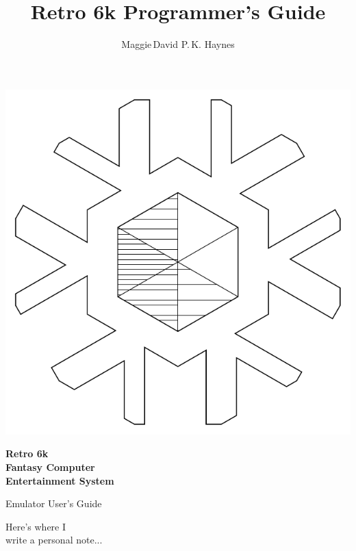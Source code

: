 \documentclass[12pt]{{memoir}}
\begin{document}
\title{Retro 6k Programmer's Guide}
\author{Maggie\,David P.\,K. Haynes}
\pagestyle{empty}
\begin{center}
\includegraphics{../common-src/logolineart}

{\sffamily\bfseries\Huge{}Retro 6k\\Fantasy Computer\\Entertainment System

Emulator User's Guide\par}
{\sffamily\bfseries\large\theauthor\par}
\end{center}
\cleartoverso
{}
\begin{center}
\noindent{}Here's where I\\
write a personal note...\par
\end{center}

\cleartorecto
\tableofcontents*
\clearpage
\pagestyle{headings}
\end{document}
